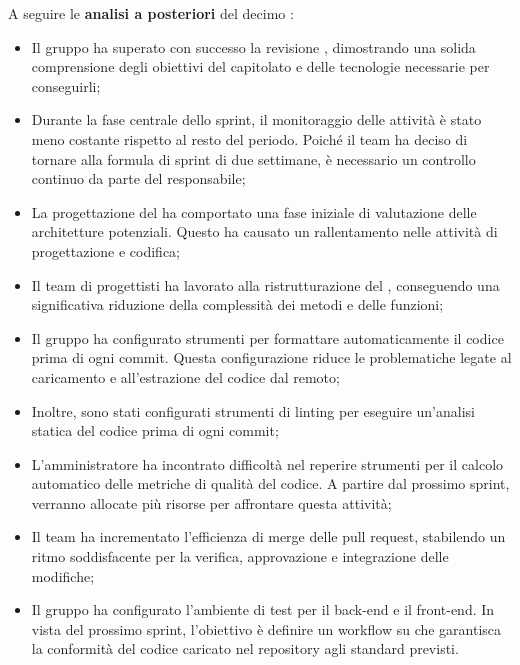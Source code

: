 \vspace{0.5\baselineskip}
\par A seguire le \textbf{analisi a posteriori} del decimo :
\begin{itemize}
  \item Il gruppo ha superato con successo la revisione , dimostrando una solida comprensione degli obiettivi del capitolato e delle tecnologie necessarie per conseguirli;
  \item Durante la fase centrale dello sprint, il monitoraggio delle attività è stato meno costante rispetto al resto del periodo. Poiché il team ha deciso di tornare alla formula di sprint di due settimane, è necessario un controllo continuo da parte del responsabile;
  \item La progettazione del  ha comportato una fase iniziale di valutazione delle architetture potenziali. Questo ha causato un rallentamento nelle attività di progettazione e codifica;
  \item Il team di progettisti ha lavorato alla ristrutturazione del , conseguendo una significativa riduzione della complessità dei metodi e delle funzioni;
  \item Il gruppo ha configurato strumenti per formattare automaticamente il codice prima di ogni commit. Questa configurazione riduce le problematiche legate al caricamento e all'estrazione del codice dal  remoto;
  \item Inoltre, sono stati configurati strumenti di linting per eseguire un'analisi statica del codice prima di ogni commit;
  \item L'amministratore ha incontrato difficoltà nel reperire strumenti per il calcolo automatico delle metriche di qualità del codice. A partire dal prossimo sprint, verranno allocate più risorse per affrontare questa attività;
  \item Il team ha incrementato l'efficienza di merge delle pull request, stabilendo un ritmo soddisfacente per la verifica, approvazione e integrazione delle modifiche;
  \item Il gruppo ha configurato l'ambiente di test per il back-end e il front-end. In vista del prossimo sprint, l'obiettivo è definire un workflow su  che garantisca la conformità del codice caricato nel repository agli standard previsti.
\end{itemize}

